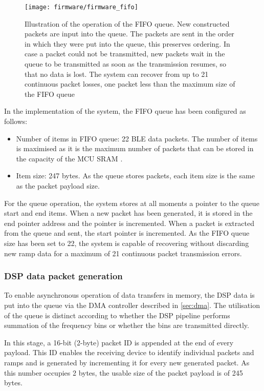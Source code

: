 \begin{figure}[ht]
	\centering
	\texttt{[image: firmware/firmware\_fifo]}
	\caption{Illustration of the operation of the FIFO queue. New constructed packets are input into the queue. The packets are sent in the order in which they were put into the queue, this preserves ordering. In case a packet could not be transmitted, new packets wait in the queue to be transmitted as soon as the transmission resumes, so that no data is lost. The system can recover from up to 21 continuous packet losses, one packet less than the maximum size of the FIFO queue
		\label{fig:firmware_fifo}}
\end{figure}

In the implementation of the system, the FIFO queue has been configured as follows:
\begin{itemize}
	\item Number of items in FIFO queue: 22 BLE data packets. The number of items is maximised as it is the maximum number of packets that can be stored in the capacity of the MCU SRAM \cite{STMicroelectronics2022a}.
	\item Item size: 247 bytes. As the queue stores packets, each item size is the same as the packet payload size.
\end{itemize}

For the queue operation, the system stores at all moments a pointer to the queue start and end items. When a new packet has been generated, it is stored in the end pointer address and the pointer is incremented. When a packet is extracted from the queue and sent, the start pointer is incremented. As the FIFO queue size has been set to 22, the system is capable of recovering without discarding new ramp data for a maximum of 21 continuous packet transmission errors.

\subsubsection{DSP data packet generation} \label{sec:packet_generation}

To enable asynchronous operation of data transfers in memory, the DSP data is put into the queue via the DMA controller described in \cref{sec:dma}. The utilisation of the queue is distinct according to whether the DSP pipeline performs summation of the frequency bins or whether the bins are transmitted directly.

In this stage, a 16-bit (2-byte) packet ID is appended at the end of every payload. This ID enables the receiving device to identify individual packets and ramps and is generated by incrementing it for every new generated packet. As this number occupies 2 bytes, the usable size of the packet payload is of 245 bytes.

